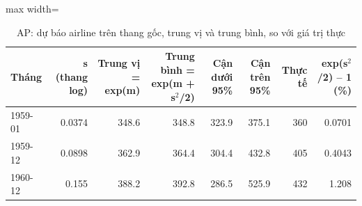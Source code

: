 \begin{table}[H]
\centering\footnotesize
\caption{AP: dự báo airline trên thang gốc, trung vị và trung bình, so với giá trị thực}\label{tab:tab_b12_09_ap_backtransform}
\begin{adjustbox}{max width=\linewidth}
\begin{tabular}{|l|r|r|r|r|r|r|r|}
\toprule
Tháng & s (thang log) & Trung vị = exp(m) & Trung bình = exp(m + s$^{2}$/2) & Cận dưới 95\% & Cận trên 95\% & Thực tế & exp(s$^{2}$/2) – 1 (\%) \\
\midrule
1959-01 & 0.0374 & 348.6 & 348.8 & 323.9 & 375.1 & 360 & 0.0701 \\
1959-12 & 0.0898 & 362.9 & 364.4 & 304.4 & 432.8 & 405 & 0.4043 \\
1960-12 & 0.155 & 388.2 & 392.8 & 286.5 & 525.9 & 432 & 1.208 \\
\bottomrule
\end{tabular}
\end{adjustbox}
\end{table}
